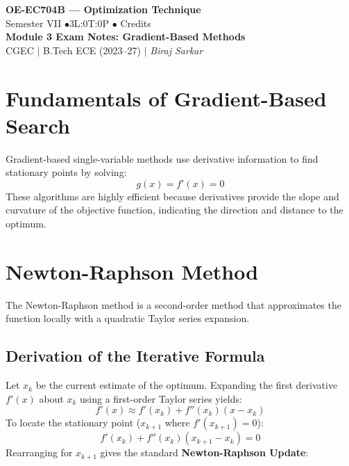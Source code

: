 \documentclass[12pt,a4paper]{article}
\begin{document}

\begin{center}
  {\LARGE\bfseries\color{myred} OE-EC704B --- Optimization Technique}\\[5pt]
  {\normalsize\color{mydark} Semester VII \quad$\bullet$\quad 3L:0T:0P \quad$\bullet$ Credits}\\[3pt]
  {\normalsize\color{myteal}\textbf{Module 3 Exam Notes: Gradient-Based Methods}}\\[3pt]
  {\small\color{mydark} CGEC \;$|$\; B.Tech ECE (2023--27) \;$|$\; \textit{Biraj Sarkar}}
\end{center}
\vspace{2pt}
\noindent{\color{myred}\rule{\linewidth}{1.5pt}}
\vspace{2pt}

\hypersetup{linkcolor=mydark}
\tableofcontents
\hypersetup{linkcolor=myteal}
\newpage

\section{Fundamentals of Gradient-Based Search}

Gradient-based single-variable methods use derivative information to find stationary points by solving:
\begin{equation}
  g(x) = f'(x) = 0
\end{equation}
These algorithms are highly efficient because derivatives provide the slope and curvature of the objective function, indicating the direction and distance to the optimum.

\section{Newton-Raphson Method}

The Newton-Raphson method is a second-order method that approximates the function locally with a quadratic Taylor series expansion.

\subsection{Derivation of the Iterative Formula}
Let $x_k$ be the current estimate of the optimum. Expanding the first derivative $f'(x)$ about $x_k$ using a first-order Taylor series yields:
\begin{equation*}
  f'(x) \approx f'(x_k) + f''(x_k)(x - x_k)
\end{equation*}
To locate the stationary point ($x_{k+1}$ where $f'(x_{k+1}) = 0$):
\begin{equation*}
  f'(x_k) + f''(x_k)(x_{k+1} - x_k) = 0
\end{equation*}
Rearranging for $x_{k+1}$ gives the standard \textbf{Newton-Raphson Update}:
\end{document}
